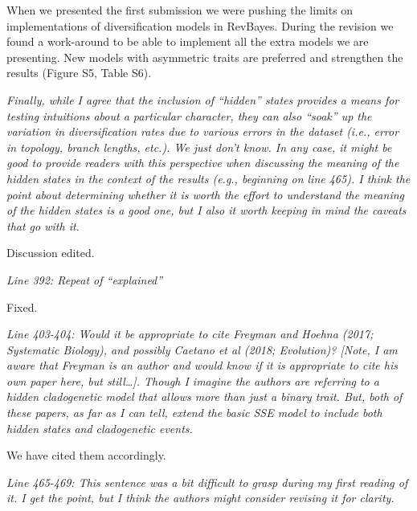 \documentclass[11pt]{article}
\renewenvironment{quote}{\bigskip\noindent\itshape\ignorespaces}{\smallskip}
\begin{document}
When we presented the first submission we were pushing the limits on implementations of diversification models in RevBayes. During the revision we found a work-around to be able to implement all the extra models we are presenting. New models with asymmetric traits are preferred and strengthen the results (Figure S5, Table S6).


\begin{quote}
Finally, while I agree that the inclusion of ``hidden'' states provides a means for testing intuitions about a particular character, they can also ``soak'' up the variation in diversification rates due to various errors in the dataset (i.e., error in topology, branch lengths, etc.).
We just don't know.
In any case, it might be good to provide readers with this perspective when discussing the meaning of the hidden states in the context of the results (e.g., beginning on line 465).
I think the point about determining whether it is worth the effort to understand the meaning of the hidden states is a good one, but I also it worth keeping in mind the caveats that go with it.
\end{quote}

Discussion edited. 


\begin{quote}
Line 392: Repeat of ``explained''
\end{quote}

Fixed.


\begin{quote}
Line 403-404: Would it be appropriate to cite Freyman and Hoehna (2017; Systematic Biology), and possibly Caetano et al (2018; Evolution)?
[Note, I am aware that Freyman is an author and would know if it is appropriate to cite his own paper here, but still\ldots]. 
Though I imagine the authors are referring to a hidden cladogenetic model that allows more than just a binary trait.
But, both of these papers, as far as I can tell, extend the basic SSE model to include both hidden states and cladogenetic events.
\end{quote}

We have cited them accordingly. 


\begin{quote}
Line 465-469: This sentence was a bit difficult to grasp during my first reading of it.
I get the point, but I think the authors might consider revising it for clarity.
\end{quote}
\end{document}
